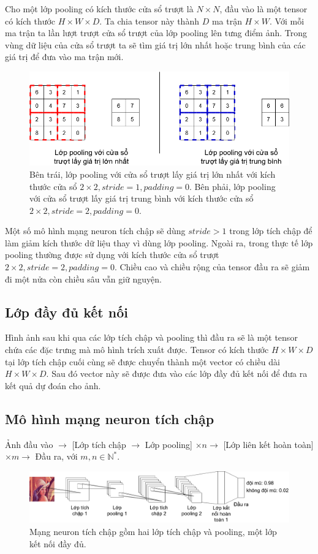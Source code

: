 Cho một lớp pooling có kích thước cửa sổ trượt là $N \times N$, đầu vào là một tensor có kích thước $H \times W \times D$. Ta chia tensor này thành $D$ ma trận $H \times W$. Với mỗi ma trận ta lần lượt trượt cửa sổ trượt của lớp pooling lên tưng điểm ảnh. Trong vùng dữ liệu của cửa sổ trượt ta sẽ tìm giá trị lớn nhất hoặc trung bình của các giá trị để đưa vào ma trận mới.
\begin{figure}[ht!]
	\centerline{\includegraphics[scale=0.4]{images/pooling.png}}
  	\caption{Bên trái, lớp pooling với cửa sổ trượt lấy giá trị lớn nhất với kích thước cửa sổ $2 \times 2, stride=1, padding=0$. Bên phải, lớp pooling với cửa sổ trượt lấy giá trị trung bình với kích thước cửa sổ $2 \times 2, stride=2, padding=0$.}
  	\label{fig:pooling}
\end{figure}
Một số mô hình mạng neuron tích chập sẽ dùng $stride>1$ trong lớp tích chập để làm giảm kích thước dữ liệu thay vì dùng lớp pooling. Ngoài ra, trong thực tế lớp pooling thường được sử dụng với kích thước cửa sổ trượt $2 \times 2, stride=2, padding=0$. Chiều cao và chiều rộng của tensor đầu ra sẽ giảm đi một nửa còn chiều sâu vẫn giữ nguyện.
\subsection{Lớp đầy đủ kết nối}
Hình ảnh sau khi qua các lớp tích chập và pooling thì đầu ra sẽ là một tensor chứa các đặc trưng mà mô hình trích xuất được. Tensor có kích thước $H \times W \times D$ tại lớp tích chập cuối cùng sẽ được chuyển thành một vector có chiều dài $H \times W \times D$. Sau đó vector này sẽ được đưa vào các lớp đầy đủ kết nối để đưa ra kết quả dự đoán cho ảnh.
\subsection{Mô hình mạng neuron tích chập}
Ảnh đầu vào $\rightarrow$ [Lớp tích chập $\rightarrow$ Lớp pooling] $\times n \rightarrow$ [Lớp liên kết hoàn toàn] $\times m \rightarrow$ Đầu ra, với $m,n \in {\mathbb{N}}^*$.
\begin{figure}[ht!]
	\centerline{\includegraphics[scale=0.25]{images/cnn_simplified.png}}
  	\caption{Mạng neuron tích chập gồm hai lớp tích chập và pooling, một lớp kết nối đầy đủ.}
  	\label{fig:cnn_simplified}
\end{figure}
